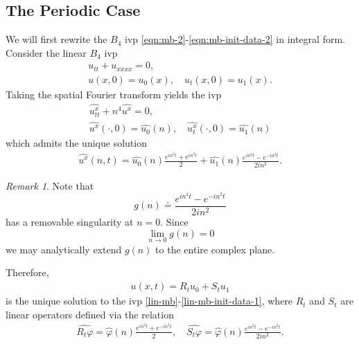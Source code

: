 \documentclass[12pt,reqno]{amsart}
\numberwithin{equation}{section}  %
\numberwithin{figure}{section}
\newcommand{\wh}{\widehat}
\newcommand{\vp}{\varphi}
\theoremstyle{plain}
\theoremstyle{definition}
\theoremstyle{remark}
\newtheorem{remark}{Remark}
\begin{document}
%
%
%
%
%
%
%
%
%



%
%
%
%
%
%
%
%
\subsection{The Periodic Case} 
\label{ssec:periodic-case}
We will first rewrite the $B_4$ ivp
\eqref{eqn:mb-2}-\eqref{eqn:mb-init-data-2} in integral form. Consider
the linear $B_4$ ivp
\begin{gather}
  u_{tt} + u_{xxxx} = 0,
  \label{lin-mb}
  \\
  u(x, 0)=u_{0}(x), \quad u_{t}(x,0) = u_{1}(x).
  \label{lin-mb-init-data-1}
\end{gather}
Taking the spatial Fourier transform yields the ivp
\begin{gather*}
  \wh{u_{tt}^{x}} + n^{4} \wh{u^{x}} = 0,
  \\
  \wh{u^{x}}(\cdot, 0) = \wh{u_{0}}(n), \quad
  \wh{u_{t}^{x}}(\cdot, 0) = \wh{u_{1}}(n)
\end{gather*}
which admits the unique solution
%
%
\begin{equation*}
  \begin{split}
    \wh{u^{x}}(n, t) = \wh{u_{0}}(n) \frac{e^{in^{2}t} + e^{in^{2}t}}{2} + 
    \wh{u_{1}}(n) \frac{e^{in^{2}t} - e^{-in^{2}t}}{2i n^{2}}.
  \end{split}
\end{equation*}
%
%
%
%
\begin{framed}
\begin{remark}
  Note that $$g(n) \doteq \frac{e^{in^{2}t} - e^{-in^{2}t}}{2i n^{2}}$$ has a removable
  singularity at $n=0$. Since $$\lim_{n \to 0} g(n) = 0$$ we may analytically
  extend $g(n)$ to the entire complex plane. 
\label{rem:analytic-extension}
\end{remark}
\end{framed}
%
%
%
Therefore,
%
%
\begin{equation*}
  \begin{split}
    u(x,t) = R_t u_{0} + S_{t}u_{1}
  \end{split}
\end{equation*}
%
is the unique solution to the ivp
\eqref{lin-mb}-\eqref{lin-mb-init-data-1}, where $R_{t}$ and $S_{t}$ are linear operators defined via the relation
%
%
\begin{gather*}
  \wh{R_{t}\vp} = \wh{\vp}(n) \frac{e^{in^{2}t} + e^{-in^{2}t}}{2} , \quad 
  \wh{S_{t}\vp} = \wh{\vp}(n) \frac{e^{in^{2}t} - e^{-in^{2}t}}{2i n^{2}}.
\end{gather*}
\end{document}
